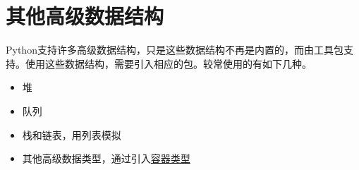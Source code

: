 \section{其他高级数据结构}
Python支持许多高级数据结构，只是这些数据结构不再是内置的，而由工具包支持。使用这些数据结构，需要引入相应的包。较常使用的有如下几种。
\begin{itemize}
\item 堆 
\item 队列 
\item 栈和链表，用列表模拟
\item 其他高级数据类型，通过引入\href{https://docs.python.org/3/library/collections.html?highlight=collections#module-collections}{容器类型}
\end{itemize}
